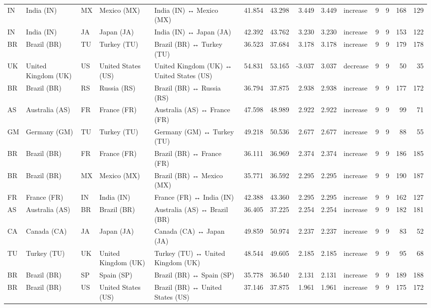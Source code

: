 \begin{tabular}{lllllrrrrlrrrr}
IN & India (IN) & MX & Mexico (MX) & India (IN) ↔ Mexico (MX) & 41.854 & 43.298 & 3.449 & 3.449 & increase & 9 & 9 & 168 & 129 \\
IN & India (IN) & JA & Japan (JA) & India (IN) ↔ Japan (JA) & 42.392 & 43.762 & 3.230 & 3.230 & increase & 9 & 9 & 153 & 122 \\
BR & Brazil (BR) & TU & Turkey (TU) & Brazil (BR) ↔ Turkey (TU) & 36.523 & 37.684 & 3.178 & 3.178 & increase & 9 & 9 & 179 & 178 \\
UK & United Kingdom (UK) & US & United States (US) & United Kingdom (UK) ↔ United States (US) & 54.831 & 53.165 & -3.037 & 3.037 & decrease & 9 & 9 & 50 & 35 \\
BR & Brazil (BR) & RS & Russia (RS) & Brazil (BR) ↔ Russia (RS) & 36.794 & 37.875 & 2.938 & 2.938 & increase & 9 & 9 & 177 & 172 \\
AS & Australia (AS) & FR & France (FR) & Australia (AS) ↔ France (FR) & 47.598 & 48.989 & 2.922 & 2.922 & increase & 9 & 9 & 99 & 71 \\
GM & Germany (GM) & TU & Turkey (TU) & Germany (GM) ↔ Turkey (TU) & 49.218 & 50.536 & 2.677 & 2.677 & increase & 9 & 9 & 88 & 55 \\
BR & Brazil (BR) & FR & France (FR) & Brazil (BR) ↔ France (FR) & 36.111 & 36.969 & 2.374 & 2.374 & increase & 9 & 9 & 186 & 185 \\
BR & Brazil (BR) & MX & Mexico (MX) & Brazil (BR) ↔ Mexico (MX) & 35.771 & 36.592 & 2.295 & 2.295 & increase & 9 & 9 & 190 & 187 \\
FR & France (FR) & IN & India (IN) & France (FR) ↔ India (IN) & 42.388 & 43.360 & 2.295 & 2.295 & increase & 9 & 9 & 162 & 127 \\
AS & Australia (AS) & BR & Brazil (BR) & Australia (AS) ↔ Brazil (BR) & 36.405 & 37.225 & 2.254 & 2.254 & increase & 9 & 9 & 182 & 181 \\
CA & Canada (CA) & JA & Japan (JA) & Canada (CA) ↔ Japan (JA) & 49.859 & 50.974 & 2.237 & 2.237 & increase & 9 & 9 & 83 & 52 \\
TU & Turkey (TU) & UK & United Kingdom (UK) & Turkey (TU) ↔ United Kingdom (UK) & 48.544 & 49.605 & 2.185 & 2.185 & increase & 9 & 9 & 95 & 68 \\
BR & Brazil (BR) & SP & Spain (SP) & Brazil (BR) ↔ Spain (SP) & 35.778 & 36.540 & 2.131 & 2.131 & increase & 9 & 9 & 189 & 188 \\
BR & Brazil (BR) & US & United States (US) & Brazil (BR) ↔ United States (US) & 37.146 & 37.875 & 1.961 & 1.961 & increase & 9 & 9 & 175 & 172 \\

\end{tabular}
